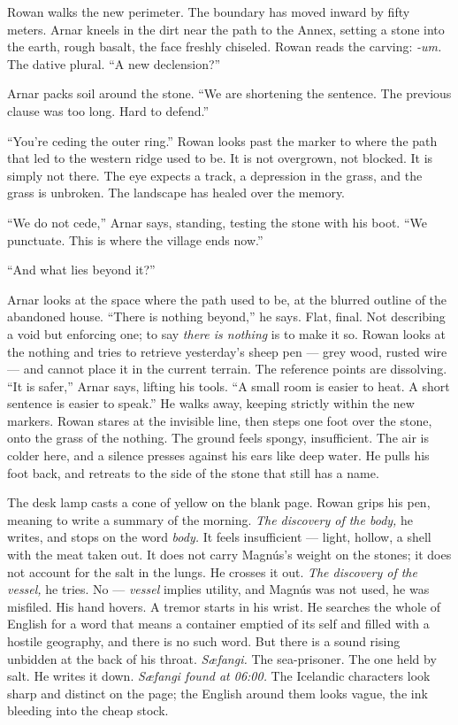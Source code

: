 \documentclass[11pt,oneside]{book}
\newcommand{\sceneline}{%
  \par\vspace{1.2em}
  \begin{center}
    \fontsize{11}{11}\selectfont \textbullet\quad\textbullet\quad\textbullet
  \end{center}
  \vspace{0.6em}\noindent\ignorespaces
}
\begin{document}
Rowan walks the new perimeter. The boundary has moved inward by fifty
meters. Arnar kneels in the dirt near the path to the Annex, setting a
stone into the earth, rough basalt, the face freshly chiseled. Rowan
reads the carving: \emph{-um.} The dative plural. ``A new declension?''

Arnar packs soil around the stone. ``We are shortening the sentence. The
previous clause was too long. Hard to defend.''

``You're ceding the outer ring.'' Rowan looks past the marker to where
the path that led to the western ridge used to be. It is not overgrown,
not blocked. It is simply not there. The eye expects a track, a
depression in the grass, and the grass is unbroken. The landscape has
healed over the memory.

``We do not cede,'' Arnar says, standing, testing the stone with his
boot. ``We punctuate. This is where the village ends now.''

``And what lies beyond it?''

Arnar looks at the space where the path used to be, at the blurred
outline of the abandoned house. ``There is nothing beyond,'' he says.
Flat, final. Not describing a void but enforcing one; to say \emph{there
is nothing} is to make it so. Rowan looks at the nothing and tries to
retrieve yesterday's sheep pen --- grey wood, rusted wire --- and cannot
place it in the current terrain. The reference points are dissolving.
``It is safer,'' Arnar says, lifting his tools. ``A small room is easier
to heat. A short sentence is easier to speak.'' He walks away, keeping
strictly within the new markers. Rowan stares at the invisible line,
then steps one foot over the stone, onto the grass of the nothing. The
ground feels spongy, insufficient. The air is colder here, and a silence
presses against his ears like deep water. He pulls his foot back, and
retreats to the side of the stone that still has a name.

\sceneline

The desk lamp casts a cone of yellow on the blank page. Rowan grips his
pen, meaning to write a summary of the morning. \emph{The discovery of
the body,} he writes, and stops on the word \emph{body.} It feels
insufficient --- light, hollow, a shell with the meat taken out. It does
not carry Magnús's weight on the stones; it does not account for the
salt in the lungs. He crosses it out. \emph{The discovery of the
vessel,} he tries. No --- \emph{vessel} implies utility, and Magnús was
not used, he was misfiled. His hand hovers. A tremor starts in his
wrist. He searches the whole of English for a word that means a
container emptied of its self and filled with a hostile geography, and
there is no such word. But there is a sound rising unbidden at the back
of his throat. \emph{Sæfangi.} The sea-prisoner. The one held by salt.
He writes it down. \emph{Sæfangi found at 06:00.} The Icelandic
characters look sharp and distinct on the page; the English around them
looks vague, the ink bleeding into the cheap stock.
\end{document}
